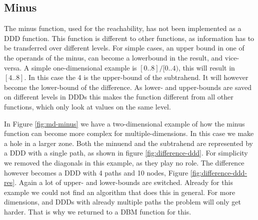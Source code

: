 \subsection{Minus}
The minus function, used for the reachability, has not been implemented as a DDD function. This function is different to other functions, as information has to be transferred over different levels. For simple cases, an upper bound in one of the operands of the minus, can become a lowerbound in the result, and vice-versa. A simple one-dimensional example is $[0..8] / [0..4)$, this will result in $[4..8]$. In this case the 4 is the upper-bound of the subtrahend. It will however become the lower-bound of the difference. As lower- and upper-bounds are saved on different levels in DDDs this makes the function different from all other functions, which only look at values on the same level.

In Figure \ref{fig:md-minus} we have a two-dimensional example of how the minus function can become more complex for multiple-dimensions. In this case we make a hole in a larger zone. Both the minuend and the subtrahend are represented by a DDD with a single path, as shown in figure \ref{fig:difference-ddd}. For simplicity we removed the diagonals in this example, as they play no role. The difference however becomes a DDD with 4 paths and 10 nodes, Figure \ref{fig:difference-ddd-res}. Again a lot of upper- and lower-bounds are switched. Already for this example we could not find an algorithm that does this in general. For more dimensions, and DDDs with already multiple paths the problem will only get harder. That is why we returned to a DBM function for this.


